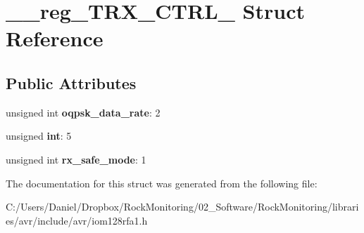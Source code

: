 \hypertarget{struct____reg___t_r_x___c_t_r_l__2}{}\section{\+\_\+\+\_\+reg\+\_\+\+T\+R\+X\+\_\+\+C\+T\+R\+L\+\_ Struct Reference}
\label{struct____reg___t_r_x___c_t_r_l__2}
\subsection*{Public Attributes}
\begin{DoxyCompactItemize}
\item 
unsigned int {\bfseries oqpsk\+\_\+data\+\_\+rate}\+: 2\hypertarget{struct____reg___t_r_x___c_t_r_l__2_a3bd2b99e762c87fc454209f6cc3507cb}{}\label{struct____reg___t_r_x___c_t_r_l__2_a3bd2b99e762c87fc454209f6cc3507cb}

\item 
unsigned {\bfseries int}\+: 5\hypertarget{struct____reg___t_r_x___c_t_r_l__2_a7e3ecadd64c6624adc9a87c8e7e1d1e2}{}\label{struct____reg___t_r_x___c_t_r_l__2_a7e3ecadd64c6624adc9a87c8e7e1d1e2}

\item 
unsigned int {\bfseries rx\+\_\+safe\+\_\+mode}\+: 1\hypertarget{struct____reg___t_r_x___c_t_r_l__2_a054136026007ed5f78b015aaf0c13c2e}{}\label{struct____reg___t_r_x___c_t_r_l__2_a054136026007ed5f78b015aaf0c13c2e}

\end{DoxyCompactItemize}


The documentation for this struct was generated from the following file\+:\begin{DoxyCompactItemize}
\item 
C\+:/\+Users/\+Daniel/\+Dropbox/\+Rock\+Monitoring/02\+\_\+\+Software/\+Rock\+Monitoring/libraries/avr/include/avr/iom128rfa1.\+h\end{DoxyCompactItemize}
